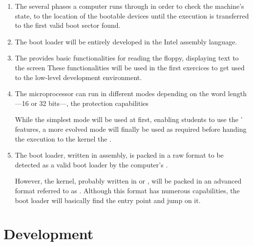 \begin{enumerate}
  \item

    \-

    The several phases a computer runs through in order to check the
    machine's state, to the location of the bootable devices until the
    execution is transferred to the first valid boot sector found.
  \item

    The boot loader will be entirely developed in the Intel 
    assembly language.
  \item

    The  provides basic functionalities for reading the floppy,
    displaying text to the screen \etc{} These functionalities will be used
    in the first exercices to get used to the low-level development
    environment.
  \item

    The  microprocessor can run in different modes depending on
    the word length---16 or 32 bits---, the protection capabilities \etc{}

    \-

    While the simplest mode will be used at first, enabling students to
    use the ' features, a more evolved mode will finally be used
    as required before handing the execution to the kernel \ie{} the
    .
  \item

    The boot loader, written in assembly, is packed in a raw format
    to be detected as a valid boot loader by the computer's .

    \-

    However, the kernel, probably written in  or , will
    be packed in an advanced format referred to as . Although this
    format has numerous capabilities, the boot loader will basically
    find the entry point and jump on it.
\end{enumerate}

\newpage

%
%

%
%

\section{Development}

